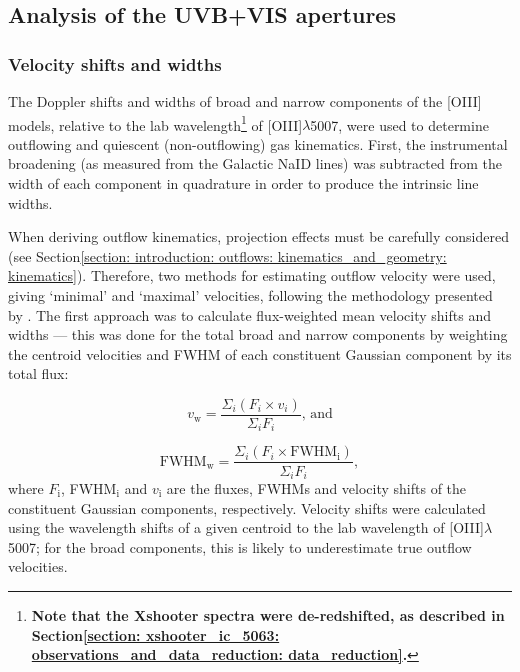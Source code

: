 \subsection{Analysis of the UVB+VIS apertures}
\label{section: xshooter_ic5063: properties_of_outflowing_gas: uvb_vis_analysis_and_results}

\subsubsection{Velocity shifts and widths}
\label{section: xshooter_ic5063: properties_of_outflowing_gas: uvb_vis_analysis_and_results: kinematics}

The Doppler shifts and widths of broad and narrow components of the [OIII] models, relative to the lab wavelength\footnote{\textbf{Note that the Xshooter spectra were de-redshifted, as described in Section\;\ref{section: xshooter_ic_5063: observations_and_data_reduction: data_reduction}.}} of [OIII]$\lambda$5007, were used to determine outflowing and quiescent (non-outflowing) gas kinematics. First, the instrumental broadening (as measured from the Galactic NaID lines) was subtracted from the width of each component in quadrature in order to produce the intrinsic line widths.

When deriving outflow kinematics, projection effects must be carefully considered (see Section\;\ref{section: introduction: outflows: kinematics_and_geometry: kinematics}). Therefore, two methods for estimating outflow velocity were used, giving `minimal' and `maximal' velocities, following the methodology presented by \citet{Rose2018}. The first approach was to calculate flux-weighted mean velocity shifts and widths --- this was done for the total broad and narrow components by weighting the centroid velocities and FWHM of each constituent Gaussian component by its total flux:

\begin{equation}
v_\mathrm{w} = \frac{\Sigma_i(F_i \times v_i)}{\Sigma_i{F_i}}\text{, and}
\label{eq: xshooter_ic5063: flux_velocity}
\end{equation}

\begin{equation}
\mathrm{FWHM_w} = \frac{\Sigma_i(F_i{\times}\mathrm{FWHM_i})}{\Sigma_i{F_i}},
\label{eq: xshooter_ic5063: flux_width}
\end{equation}
\noindent
where $F_\mathrm{i}$, FWHM$_\mathrm{i}$ and $v_\mathrm{i}$ are the fluxes, FWHMs and velocity shifts of the constituent Gaussian components, respectively. Velocity shifts were calculated using the wavelength shifts of a given centroid to the lab wavelength of [OIII]$\lambda$5007; for the broad components, this is likely to underestimate true outflow velocities.

